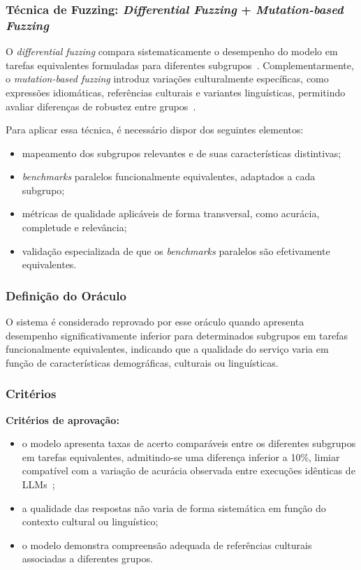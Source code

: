 \subsubsection{Técnica de Fuzzing: \textit{Differential Fuzzing} + \textit{Mutation-based Fuzzing}}

O \textit{differential fuzzing} compara sistematicamente o desempenho do modelo em tarefas equivalentes formuladas para diferentes subgrupos~\cite{McKeeman1998, Galhotra2017}. Complementarmente, o \textit{mutation-based fuzzing} introduz variações culturalmente específicas, como expressões idiomáticas, referências culturais e variantes linguísticas, permitindo avaliar diferenças de robustez entre grupos~\cite{Xie2019}.

Para aplicar essa técnica, é necessário dispor dos seguintes elementos:

\begin{itemize}
    \item mapeamento dos subgrupos relevantes e de suas características distintivas;
    \item \textit{benchmarks} paralelos funcionalmente equivalentes, adaptados a cada subgrupo;
    \item métricas de qualidade aplicáveis de forma transversal, como acurácia, completude e relevância;
    \item validação especializada de que os \textit{benchmarks} paralelos são efetivamente equivalentes.
\end{itemize}

\subsubsection{Definição do Oráculo}

O sistema é considerado reprovado por esse oráculo quando apresenta desempenho significativamente inferior para determinados subgrupos em tarefas funcionalmente equivalentes, indicando que a qualidade do serviço varia em função de características demográficas, culturais ou linguísticas.

\subsubsection{Critérios}

\textbf{Critérios de aprovação:}

\begin{itemize}
    \item o modelo apresenta taxas de acerto comparáveis entre os diferentes subgrupos em tarefas equivalentes, admitindo-se uma diferença inferior a 10\%, limiar compatível com a variação de acurácia observada entre execuções idênticas de LLMs~\cite{Atil2024};
    \item a qualidade das respostas não varia de forma sistemática em função do contexto cultural ou linguístico;
    \item o modelo demonstra compreensão adequada de referências culturais associadas a diferentes grupos.
\end{itemize}

